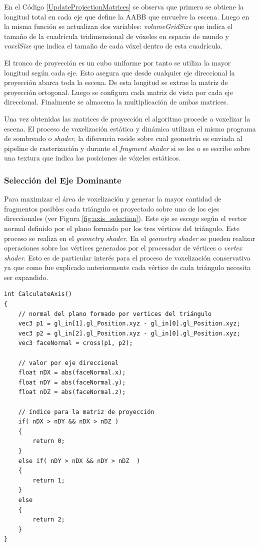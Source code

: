 En el Código \ref{UpdateProjectionMatrices} se observa que primero se obtiene la longitud total en cada eje que define la \ac{AABB} que envuelve la escena. Luego en la misma función se actualizan dos variables: \emph{volumeGridSize} que indica el tamaño de la cuadrícula tridimensional de vóxeles en espacio de mundo y \emph{voxelSize} que indica el tamaño de cada vóxel dentro de esta cuadrícula. 

El tronco de proyección es un cubo uniforme por tanto se utiliza la mayor longitud según cada eje. Esto asegura que desde cualquier eje direccional la proyección abarca toda la escena. De esta longitud se extrae la matriz de proyección ortogonal. Luego se configura cada matriz de vista por cada eje direccional. Finalmente se almacena la multiplicación de ambas matrices.

Una vez obtenidas las matrices de proyección el algoritmo procede a voxelizar la escena. El proceso de voxelización estática y dinámica utilizan el mismo programa de sombreado o \emph{shader}, la diferencia reside sobre cual geometría es enviada al pipeline de rasterización y durante el \emph{fragment shader} si se lee o se escribe sobre una textura que indica las posiciones de vóxeles estáticos.

\subsubsection{Selección del Eje Dominante}
Para maximizar el área de voxelización y generar la mayor cantidad de fragmentos posibles cada triángulo es proyectado sobre uno de los ejes direccionales (ver Figura \ref{fig:axis_selection}). Este eje se escoge según el vector normal definido por el plano formado por los tres vértices del triángulo. Este proceso se realiza en el \emph{geometry shader}. En el \emph{geometry shader} se pueden realizar operaciones sobre los vértices generados por el procesador de vértices o \emph{vertex shader}. Esto es de particular interés para el proceso de voxelización conservativa ya que como fue explicado anteriormente cada vértice de cada triángulo necesita ser expandido.
\\
\begin{lstlisting}[caption={Selección del eje dominante para la proyección ortogonal.}, label=CalculateAxis]
int CalculateAxis()
{
    // normal del plano formado por vertices del triángulo
    vec3 p1 = gl_in[1].gl_Position.xyz - gl_in[0].gl_Position.xyz;
    vec3 p2 = gl_in[2].gl_Position.xyz - gl_in[0].gl_Position.xyz;
    vec3 faceNormal = cross(p1, p2);

    // valor por eje direccional
    float nDX = abs(faceNormal.x);
    float nDY = abs(faceNormal.y);
    float nDZ = abs(faceNormal.z);

    // índice para la matriz de proyección
    if( nDX > nDY && nDX > nDZ )
    {
        return 0;
    }
    else if( nDY > nDX && nDY > nDZ  )
    {
        return 1;
    }
    else
    {
        return 2;
    }
}
\end{lstlisting}

